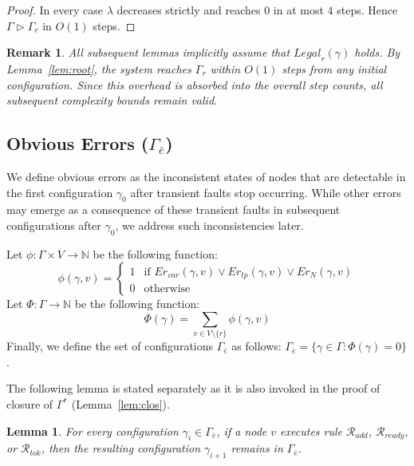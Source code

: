 \documentclass[a4paper, 12pt]{article}
\newtheorem{lemma}[theorem]{Lemma}
\newtheorem{remark}[theorem]{Remark}
\newcommand{\Rtok}{$\mathscr{R}_{tok}$}
\newcommand{\Radd}{$\mathscr{R}_{add}$}
\newcommand{\Rready}{$\mathscr{R}_{ready}$}
\begin{document}
\begin{proof}
\medskip
In every case $\lambda$ decreases strictly and reaches $0$ in at most 
$4$ steps. Hence $\Gamma \triangleright \Gamma_r$ in $O(1)$ steps.
\end{proof}

\begin{remark}
\label{rem:root}
All subsequent lemmas implicitly assume that $\mathit{Legal}_r(\gamma)$ 
holds. By Lemma~\ref{lem:root}, the system reaches $\Gamma_r$ within 
$O(1)$ steps from any initial configuration. Since this overhead is 
absorbed into the overall step counts, all subsequent complexity bounds 
remain valid.
\end{remark}
\subsection{Obvious Errors ($\Gamma_{\bar{e}}$)}
\label{subsec:obvious}

We define obvious errors as the inconsistent states of nodes that are 
detectable in the first configuration $\gamma_0$ after transient faults 
stop occurring. While other errors may emerge as a consequence of these 
transient faults in subsequent configurations after $\gamma_0$, we 
address such inconsistencies later.

Let $\phi:\Gamma\times V \rightarrow \mathbb{N}$ be the following 
function:
$$\phi(\gamma,v)=
\left\{
  \begin{array}{ll}
   1 & \text{if } Er_{var}(\gamma,v) \vee Er_{tp}(\gamma,v) 
       \vee Er_N(\gamma,v)\\
   0 & \text{otherwise}
  \end{array}
\right.
$$
Let $\Phi:\Gamma \rightarrow \mathbb{N}$ be the following function:
$$\Phi(\gamma)=\sum_{v\in V\setminus\{r\}}\phi(\gamma,v)$$
Finally, we define the set of configurations $\Gamma_{\bar{e}}$ as 
follows: $\Gamma_{\bar{e}}=\{\gamma\in \Gamma:\Phi(\gamma)=0\}$.

\medskip
The following lemma is stated separately as it is also invoked in the 
proof of closure of $\Gamma^*$ (Lemma~\ref{lem:clos}).

\begin{lemma}
\label{lem:add}
For every configuration $\gamma_i \in \Gamma_{\bar{e}}$, if a node $v$ 
executes rule \Radd, \Rready, or \Rtok, then the resulting configuration 
$\gamma_{i+1}$ remains in $\Gamma_{\bar{e}}$.
\end{lemma}
\end{document}
